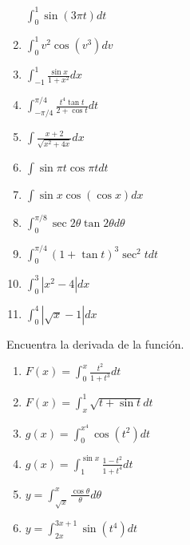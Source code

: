 \documentclass[12pt,]{article}
\begin{document}
\begin{enumerate}
  \(\displaystyle\int_{0}^{1}\sin(3\pi t)dt\)
\item
  \(\displaystyle\int_{0}^{1}v^2\cos(v^3)dv\)
\item
  \(\displaystyle\int_{-1}^{1}\frac{\sin x }{1+x^2}dx\)
\item
  \(\displaystyle\int_{-\pi/4}^{\pi/4}\frac{t^4\tan t}{2+\cos t}dt\)
\item
  \(\displaystyle\int\frac{x+2}{\sqrt{x^2+4x}}dx\)
\item
  \(\displaystyle\int\sin \pi t \cos \pi t dt\)
\item
  \(\displaystyle\int\sin x \cos(\cos x)dx\)
\item
  \(\displaystyle\int_{0}^{\pi/8}\sec2\theta \tan 2\theta d\theta\)
\item
  \(\displaystyle\int_{0}^{\pi/4}(1+\tan t)^3\sec^2t dt\)
\item
  \(\displaystyle\int_{0}^{3}|x^2-4|dx\)
\item
  \(\displaystyle\int_{0}^{4}|\sqrt{x}-1|dx\)
\end{enumerate}

Encuentra la derivada de la función.

\begin{enumerate}
\def\labelenumi{\arabic{enumi}.}
\setcounter{enumi}{88}
\item
  \(F(x)=\displaystyle\int_{0}^{x}\frac{t^2}{1+t^3}dt\)
\item
  \(F(x)=\displaystyle\int_{x}^{1}\sqrt{t+\sin t}dt\)
\item
  \(g(x)=\displaystyle\int_{0}^{x^4}\cos(t^2)dt\)
\item
  \(g(x)=\displaystyle\int_{1}^{\sin x}\frac{1-t^2}{1+t^4}dt\)
\item
  \(y=\displaystyle\int_{\sqrt{x}}^{x}\frac{\cos\theta}{\theta}d\theta\)
\item
  \(y=\displaystyle\int_{2x}^{3x+1}\sin(t^4)dt\)
\end{enumerate}

\newpage
\end{document}
